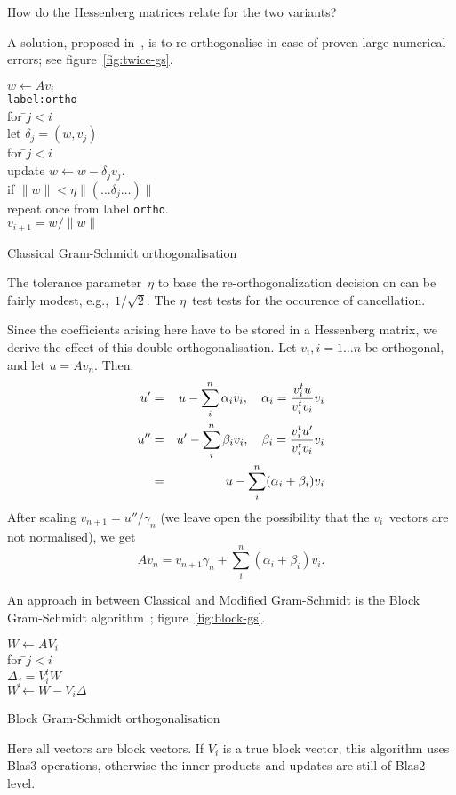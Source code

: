 \documentclass[11pt]{artikel3}
\begin{document}
\begin{Outline}
\begin{question}
How do the Hessenberg matrices relate for the two variants?
\end{question}

A solution, proposed in~\cite{DanielGKS:stable-gs}, is to
re-orthogonalise in case of proven large numerical errors;
see figure~\ref{fig:twice-gs}.
\begin{rfigure}
\begin{tabbing}
$w\leftarrow Av_i$\\
{\tt label:ortho}\\
for \=$j<i$\\
\>let $\delta_j=(w,v_j)$\\
for \=$j<i$\\
\>update $w\leftarrow w-\delta_jv_j$.\\
if $\|w\|<\eta \|(\ldots \delta_j\ldots)\|$ \\
\>repeat once from label {\tt ortho}.\\
$v_{i+1} = w/\|w\|$
\end{tabbing}
\caption{Classical Gram-Schmidt orthogonalisation}
\label{fig:twice-gs}
\end{rfigure}
The tolerance parameter~$\eta$ to base the re-orthogonalization
decision on can be fairly modest, e.g.,~$1/\sqrt 2$. The $\eta$~test
tests for the occurence of cancellation.

Since the coefficients arising here have to be
stored in a Hessenberg matrix, we derive the effect of this double
orthogonalisation. Let $v_i,i=1\ldots n$ be orthogonal, and let
$u=Av_n$. Then:
\begin{eqnarray*}
u'&=&u-\sum_i^n \alpha_iv_i,\quad \alpha_i={v_i^tu\over v_i^tv_i}v_i\\
u''&=&u'-\sum_i^n \beta_iv_i,\quad \beta_i={v_i^tu'\over
v_i^tv_i}v_i\\
&=&u-\sum_i^n(\alpha_i+\beta_i)v_i
\end{eqnarray*}
After scaling $v_{n+1}=u''/\gamma_n$ (we leave open the possibility
that the $v_i$~vectors are not normalised), we get
\[ Av_n = v_{n+1}\gamma_n+\sum_i^n(\alpha_i+\beta_i)v_i. \]

An approach in between Classical and Modified Gram-Schmidt
is the Block Gram-Schmidt 
algorithm~\cite{JalbyPhilippe:block-gs}; figure~\ref{fig:block-gs}.
\begin{rfigure}
\begin{tabbing}
$W\leftarrow AV_i$\\
for \=$j<i$\\
\>$\Delta_j=V_i^tW$\\
\>$W\leftarrow W-V_i\Delta$
\end{tabbing}
\caption{Block Gram-Schmidt orthogonalisation}
\label{fig:block-gs}
\end{rfigure}
Here all vectors are block vectors.
If $V_i$ is a true block vector, this algorithm uses Blas3 operations,
otherwise the inner products and updates are still of Blas2 level.


\end{Outline}
\end{document}
